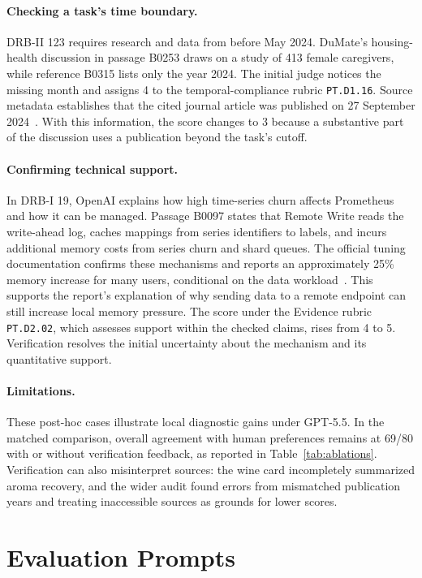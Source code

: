 \documentclass{article}
\begin{document}
\paragraph{Checking a task's time boundary.}
DRB-II 123 requires research and data from before May 2024. DuMate's housing-health discussion in passage B0253 draws on a study of 413 female caregivers, while reference B0315 lists only the year 2024. The initial judge notices the missing month and assigns 4 to the temporal-compliance rubric \texttt{PT.D1.16}. Source metadata establishes that the cited journal article was published on 27 September 2024~\citep{chan2024dwelling}. With this information, the score changes to 3 because a substantive part of the discussion uses a publication beyond the task's cutoff.

\paragraph{Confirming technical support.}
In DRB-I 19, OpenAI explains how high time-series churn affects Prometheus and how it can be managed. Passage B0097 states that Remote Write reads the write-ahead log, caches mappings from series identifiers to labels, and incurs additional memory costs from series churn and shard queues. The official tuning documentation confirms these mechanisms and reports an approximately 25\% memory increase for many users, conditional on the data workload~\citep{prometheus_remote_write}. This supports the report's explanation of why sending data to a remote endpoint can still increase local memory pressure. The score under the Evidence rubric \texttt{PT.D2.02}, which assesses support within the checked claims, rises from 4 to 5. Verification resolves the initial uncertainty about the mechanism and its quantitative support.

\paragraph{Limitations.}
These post-hoc cases illustrate local diagnostic gains under GPT-5.5. In the matched comparison, overall agreement with human preferences remains at 69/80 with or without verification feedback, as reported in Table~\ref{tab:ablations}. Verification can also misinterpret sources: the wine card incompletely summarized aroma recovery, and the wider audit found errors from mismatched publication years and treating inaccessible sources as grounds for lower scores.

\raggedbottom
\section{Evaluation Prompts}
\label{app:prompts}
\end{document}
